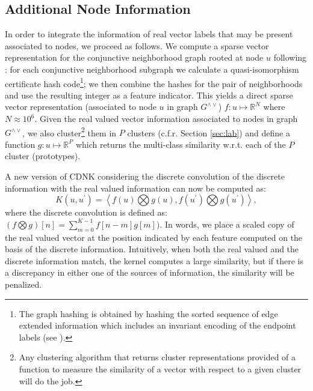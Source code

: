 \documentclass[review]{elsarticle}
\begin{document}
\subsection{Additional Node Information}
In order to integrate the information of real vector labels that may be present associated to nodes, we proceed as follows. We compute a sparse vector representation for the conjunctive neighborhood graph rooted at node $u$ following \cite{costa2010fast}: for each conjunctive neighborhood subgraph we calculate a quasi-isomorphism certificate hash code\footnote{The graph hashing is obtained by  hashing the sorted sequence of edge extended information which includes an invariant encoding of the endpoint labels (see \cite{costa2010fast}).}; we then combine the hashes for the pair of neighborhoods and use the resulting integer as a feature indicator. This yields a direct sparse vector representation (associated to node $u$ in graph $G^{\wedge\vee}$) $f: u \longmapsto \mathbb{R}^N$ where $N \approx 10^6$. Given the real valued vector information associated to nodes in graph $G^{\wedge\vee}$, we also cluster\footnote{Any clustering algorithm that returns cluster representations provided of a function to measure the similarity of a vector with respect to a given cluster will do the job.} them in $P$ clusters (c.f.r. Section \ref{sec:lab}) and define a function $g: u \longmapsto \mathbb{R}^P$ which returns the multi-class similarity w.r.t. each of the $P$ cluster (prototypes). 

A new version of CDNK considering the discrete convolution of the discrete information with the real valued information can now be computed as:   
\begin{equation}
K(u,u^\prime) = \left< f(u) \bigotimes g(u), f(u^\prime) \bigotimes g(u^\prime) \right>,
\end{equation}
where the discrete convolution is defined as: 
$(f \bigotimes g)[n]=\sum _{m=0}^{K-1}f[n-m]g[m])$.
In words, we place a scaled copy of the real valued vector at the position indicated by each feature computed on the basis of the discrete information. Intuitively, when both the real valued and the discrete information match, the kernel computes a large similarity, but if there is a discrepancy in either one of the sources of information, the similarity will be penalized. 
\end{document}
